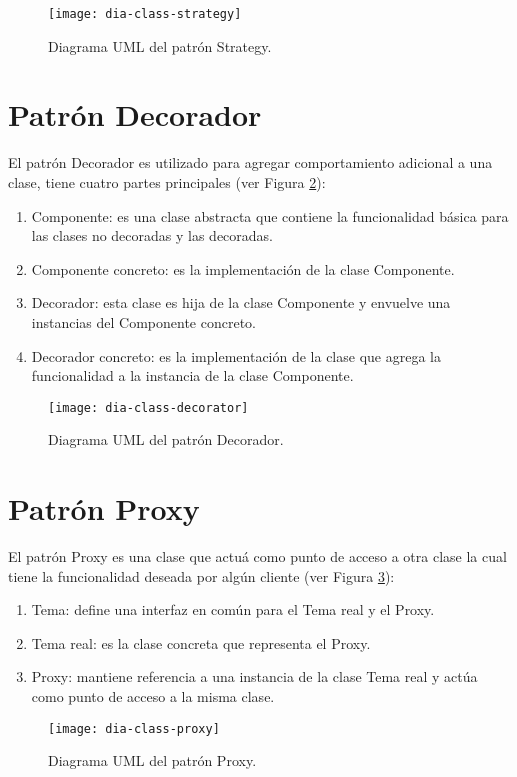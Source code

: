 \begin{figure}[h]
  \centering
  \texttt{[image: dia-class-strategy]}
  \caption{Diagrama UML del patrón Strategy\cite{DesignPatternsLasater}.}
  \label{fig:dia-class-strategy}
\end{figure}

\section{Patrón Decorador}\label{sec-decorator}
El patrón Decorador es utilizado para agregar comportamiento adicional a una clase, tiene cuatro partes principales\cite{DesignPatternsLasater} (ver Figura \ref{fig:dia-class-decorator}):
\begin{enumerate}
  \item Componente: es una clase abstracta que contiene la funcionalidad básica para las clases no decoradas y las decoradas.
  \item Componente concreto: es la implementación de la clase Componente.
  \item Decorador: esta clase es hija de la clase Componente y envuelve una instancias del Componente concreto.
  \item Decorador concreto: es la implementación de la clase que agrega la funcionalidad a la instancia de la clase Componente.
\end{enumerate}

\begin{figure}[h]
  \centering
  \texttt{[image: dia-class-decorator]}
  \caption{Diagrama UML del patrón Decorador\cite{DesignPatternsLasater}.}
  \label{fig:dia-class-decorator}
\end{figure}

\section{Patrón Proxy}\label{sec-proxy}
El patrón Proxy es una clase que actuá como punto de acceso a otra clase la cual tiene la funcionalidad deseada por algún cliente\cite{DesignPatternsLasater} (ver Figura \ref{fig:dia-class-proxy}):
\begin{enumerate}
  \item Tema: define una interfaz en común para el Tema real y el Proxy.
  \item Tema real: es la clase concreta que representa el Proxy.
  \item Proxy: mantiene referencia a una instancia de la clase Tema real y actúa como punto de acceso a la misma clase.
\end{enumerate}
\begin{figure}[h]
  \centering
  \texttt{[image: dia-class-proxy]}
  \caption{Diagrama UML del patrón Proxy\cite{DesignPatternsLasater}.}
  \label{fig:dia-class-proxy}
\end{figure}

